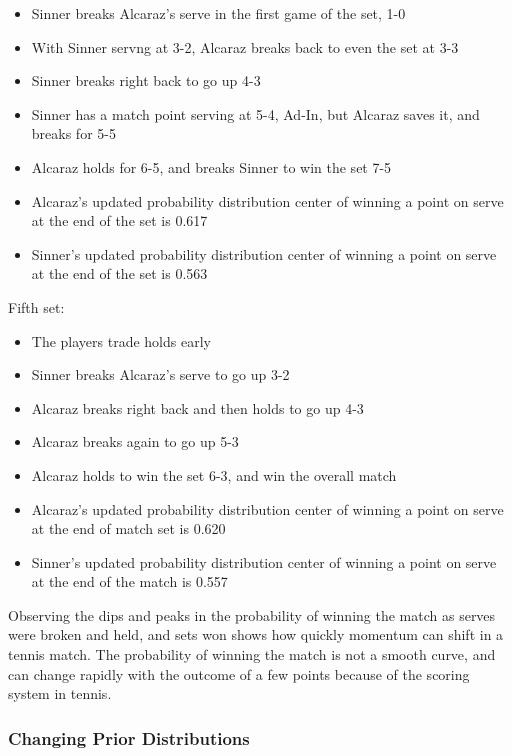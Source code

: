 \documentclass[
  letterpaper,
  DIV=11,
  numbers=noendperiod]{scrartcl}
\providecommand{\tightlist}{%
  \setlength{\itemsep}{0pt}\setlength{\parskip}{0pt}}\usepackage{longtable,booktabs,array}
\begin{document}
\begin{itemize}
\tightlist
\item
  Sinner breaks Alcaraz's serve in the first game of the set, 1-0
\item
  With Sinner servng at 3-2, Alcaraz breaks back to even the set at 3-3
\item
  Sinner breaks right back to go up 4-3
\item
  Sinner has a match point serving at 5-4, Ad-In, but Alcaraz saves it,
  and breaks for 5-5
\item
  Alcaraz holds for 6-5, and breaks Sinner to win the set 7-5
\item
  Alcaraz's updated probability distribution center of winning a point
  on serve at the end of the set is 0.617
\item
  Sinner's updated probability distribution center of winning a point on
  serve at the end of the set is 0.563
\end{itemize}

Fifth set:

\begin{itemize}
\tightlist
\item
  The players trade holds early
\item
  Sinner breaks Alcaraz's serve to go up 3-2
\item
  Alcaraz breaks right back and then holds to go up 4-3
\item
  Alcaraz breaks again to go up 5-3
\item
  Alcaraz holds to win the set 6-3, and win the overall match
\item
  Alcaraz's updated probability distribution center of winning a point
  on serve at the end of match set is 0.620
\item
  Sinner's updated probability distribution center of winning a point on
  serve at the end of the match is 0.557
\end{itemize}

Observing the dips and peaks in the probability of winning the match as
serves were broken and held, and sets won shows how quickly momentum can
shift in a tennis match. The probability of winning the match is not a
smooth curve, and can change rapidly with the outcome of a few points
because of the scoring system in tennis.

\subsubsection{Changing Prior Distributions}\label{sec-changeprior}
\end{document}
